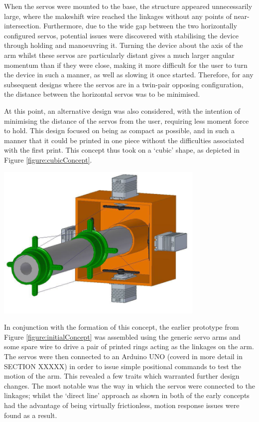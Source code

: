 \documentclass[11pt]{article}
\begin{document}
When the servos were mounted to the base, the structure appeared unnecessarily large, where the makeshift wire reached the linkages without any points of near-intersection. Furthermore, due to the wide gap between the two horizontally configured servos, potential issues were discovered with stabilising the device through holding and manoeuvring it. Turning the device about the axis of the arm whilst these servos are particularly distant gives a much larger angular momentum than if they were close, making it more difficult for the user to turn the device in such a manner, as well as slowing it once started. Therefore, for any subsequent designs where the servos are in a twin-pair opposing configuration, the distance between the horizontal servos was to be minimised.

At this point, an alternative design was also considered, with the intention of minimising the distance of the servos from the user, requiring less moment force to hold. This design focused on being as compact as possible, and in such a manner that it could be printed in one piece without the difficulties associated with the first print. This concept thus took on a `cubic' shape, as depicted in Figure \ref{figure:cubicConcept}.

\begin{center}
\includegraphics[width=0.75\textwidth]{images/cubicConcept.png}
\label{figure:cubicConcept}
\end{center}

In conjunction with the formation of this concept, the earlier prototype from Figure \ref{figure:initialConcept} was assembled using the generic servo arms and some spare wire to drive a pair of printed rings acting as the linkages on the arm. The servos were then connected to an Arduino UNO (coverd in more detail in SECTION XXXXX) in order to issue simple positional commands to test the motion of the arm. This revealed a few traits which warranted further design changes. The most notable was the way in which the servos were connected to the linkages; whilst the `direct line' approach as shown in both of the early concepts had the advantage of being virtually frictionless, motion response issues were found as a result. 
\end{document}

